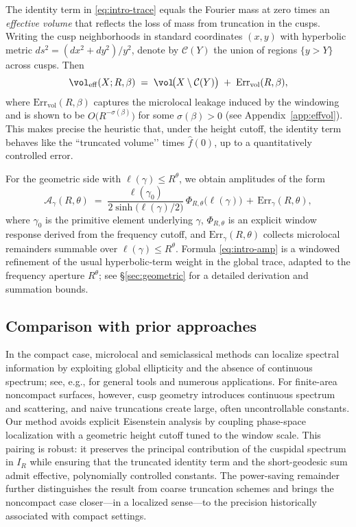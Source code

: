 The identity term in \eqref{eq:intro-trace} equals the Fourier mass at zero times an \emph{effective volume} that reflects the loss of mass from truncation in the cusps. Writing the cusp neighborhoods in standard coordinates $(x,y)$ with hyperbolic metric $ds^2=(dx^2+dy^2)/y^2$, denote by $\mathcal{C}(Y)$ the union of regions $\{y>Y\}$ across cusps. Then
\[
  \vol_{\mathrm{eff}}(X;R,\beta)
  \;=\;
  \vol\!\big(X\setminus\mathcal{C}(Y)\big)
  \;+\;
  \mathrm{Err}_{\mathrm{vol}}(R,\beta),
\]
where $\mathrm{Err}_{\mathrm{vol}}(R,\beta)$ captures the microlocal leakage induced by the windowing and is shown to be $O\!\big(R^{-\sigma(\beta)}\big)$ for some $\sigma(\beta)>0$ (see Appendix~\ref{app:effvol}). This makes precise the heuristic that, under the height cutoff, the identity term behaves like the “truncated volume’’ times $\widehat{f}(0)$, up to a quantitatively controlled error.

For the geometric side with $\ell(\gamma)\le R^\theta$, we obtain amplitudes of the form
\begin{equation}\label{eq:intro-amp}
  \mathcal{A}_\gamma(R,\theta)
  \;=\;
  \frac{\ell(\gamma_0)}{2\sinh\!\big(\ell(\gamma)/2\big)}
  \,\Phi_{R,\theta}\!\big(\ell(\gamma)\big)
  \,+\, \mathrm{Err}_\gamma(R,\theta),
\end{equation}
where $\gamma_0$ is the primitive element underlying $\gamma$, $\Phi_{R,\theta}$ is an explicit window response derived from the frequency cutoff, and $\mathrm{Err}_\gamma(R,\theta)$ collects microlocal remainders summable over $\ell(\gamma)\le R^\theta$. Formula \eqref{eq:intro-amp} is a windowed refinement of the usual hyperbolic-term weight in the global trace, adapted to the frequency aperture $R^\theta$; see \S\ref{sec:geometric} for a detailed derivation and summation bounds.

\subsection{Comparison with prior approaches}

In the compact case, microlocal and semiclassical methods can localize spectral information by exploiting global ellipticity and the absence of continuous spectrum; see, e.g., \cite{zworski2012} for general tools and numerous applications. For finite-area noncompact surfaces, however, cusp geometry introduces continuous spectrum and scattering, and naive truncations create large, often uncontrollable constants. Our method avoids explicit Eisenstein analysis by coupling phase-space localization with a geometric height cutoff tuned to the window scale. This pairing is robust: it preserves the principal contribution of the cuspidal spectrum in $I_R$ while ensuring that the truncated identity term and the short-geodesic sum admit effective, polynomially controlled constants. The power-saving remainder further distinguishes the result from coarse truncation schemes and brings the noncompact case closer—in a localized sense—to the precision historically associated with compact settings.

